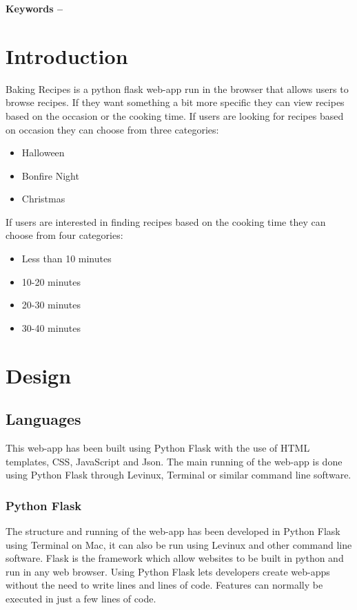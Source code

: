 \documentclass[10pt, a4paper]{article}
\title{\mytitle}
\author{\myauthor\hspace{1em}\\\contact\\Edinburgh Napier University\hspace{0.5em}-\hspace{0.5em}\mymodule}
\date{}
\begin{document}
	\maketitle
	\begin{abstract}
	 The aim of the coursework was to develop a web application for an online catalogue using Python Flask. This report covers the design of the web-app including URL hierarchy, enhancements, critical evaluation and personal evaluation. 
	\end{abstract}
    
	\textbf{Keywords -- }{\mykeywords}

	\section{Introduction}
    Baking Recipes is a python flask web-app run in the browser that allows users to browse recipes. If they want something a bit more specific they can view recipes based on the occasion or the cooking time. If users are looking for recipes based on occasion they can choose from three categories: \begin{itemize}
	    \item Halloween
	    \item Bonfire Night
	    \item Christmas
	    \end{itemize}
	If users are interested in finding recipes based on the cooking time they can choose from four categories:\begin{itemize}
        \item Less than 10 minutes
 	    \item 10-20 minutes
 		\item 20-30 minutes
 		\item 30-40 minutes
 		\end{itemize}
	
	\section{Design}
	\subsection{Languages}
	This web-app has been built using Python Flask with the use of HTML templates, CSS, JavaScript and Json. The main running of the web-app is done using Python Flask through Levinux, Terminal or similar command line software.
	
	\subsubsection{Python Flask}
	The structure and running of the web-app has been developed in Python Flask using Terminal on Mac, it can also be run using Levinux and other command line software. Flask is the framework which allow websites to be built in python and run in any web browser. Using Python Flask lets developers create web-apps without the need to write lines and lines of code. Features can normally be executed in just a few lines of code.
\end{document}
